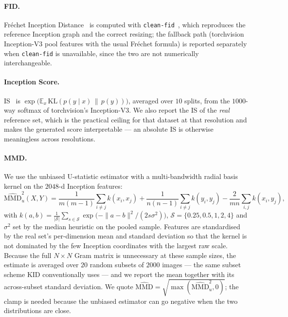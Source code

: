 \documentclass[11pt]{article}
\newcommand{\code}[1]{\texttt{\small #1}}
\begin{document}
\paragraph{FID.} Fr\'echet Inception Distance~\citep{heusel2017gans} is computed
with \code{clean-fid}~\citep{parmar2022aliased}, which reproduces the reference
Inception graph and the correct resizing; the fallback path (torchvision
Inception-V3 pool features with the usual Fr\'echet formula) is reported
separately when \code{clean-fid} is unavailable, since the two are not
numerically interchangeable.

\paragraph{Inception Score.} IS~\citep{salimans2016improved} is
$\exp\big(\mathbb{E}_x\,\mathrm{KL}(p(y\mid x)\,\|\,p(y))\big)$, averaged over
$10$ splits, from the $1000$-way softmax of torchvision's Inception-V3. We also
report the IS of the \emph{real} reference set, which is the practical ceiling
for that dataset at that resolution and makes the generated score
interpretable --- an absolute IS is otherwise meaningless across resolutions.

\paragraph{MMD.} We use the unbiased U-statistic estimator with a
multi-bandwidth radial basis kernel on the $2048$-d Inception features:
\begin{equation}
  \label{eq:mmd}
  \widehat{\mathrm{MMD}}^2_u(X,Y) =
  \frac{1}{m(m-1)}\sum_{i\neq j} k(x_i,x_j)
  + \frac{1}{n(n-1)}\sum_{i\neq j} k(y_i,y_j)
  - \frac{2}{mn}\sum_{i,j} k(x_i,y_j),
\end{equation}
with $k(a,b) = \frac{1}{|\mathcal{S}|}\sum_{s\in\mathcal{S}}
\exp\!\big(-\|a-b\|^2/(2 s\sigma^2)\big)$, $\mathcal{S} = \{0.25, 0.5, 1, 2,
4\}$ and $\sigma^2$ set by the median heuristic on the pooled sample. Features
are standardised by the real set's per-dimension mean and standard deviation so
that the kernel is not dominated by the few Inception coordinates with the
largest raw scale. Because the full $N\times N$ Gram matrix is unnecessary at
these sample sizes, the estimate is averaged over $20$ random subsets of $2000$
images --- the same subset scheme KID conventionally uses --- and we report the
mean together with its across-subset standard deviation. We quote
$\widehat{\mathrm{MMD}} = \sqrt{\max(\widehat{\mathrm{MMD}}^2_u, 0)}$; the
clamp is needed because the unbiased estimator can go negative when the two
distributions are close.
\end{document}
